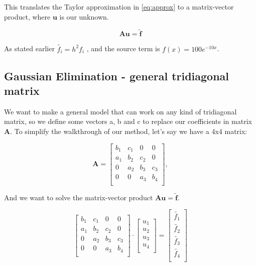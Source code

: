 \documentclass[oneside, final, 11pt, english, twocolumn]{article}
\begin{document}
This translates the Taylor approximation in \eqref{eq:approx} to a matrix-vector product, where $\mathbf{u}$ is our unknown. 

\begin{equation}
\mathbf{A}\mathbf{u} = \tilde{\mathbf{f}}
\label{eq:linalg}
\end{equation}

As stated earlier $\tilde{f_i} = h^2 f_i$ , and the source term is $f(x) = 100 e^{-10x}$. 


\subsection{Gaussian Elimination - general tridiagonal matrix}

We want to make a general model that can work on any kind of tridiagonal matrix, so we define some vectors a, b and c to replace our coefficients in matrix $\mathbf{A}$. To simplify the walkthrough of our method, let's say we have a 4x4 matrix: 

\[
    \mathbf{A} = \begin{bmatrix}
                           b_1& c_1& 0 &0 \\
                           a_1 & b_2 & c_2 &0  \\
                           0&a_2 &b_3 & c_3 \\
                           0&0 & a_3 & b_4 \\
                      \end{bmatrix},
\]


And we want to solve the matrix-vector product $\mathbf{A}\mathbf{u} = \tilde{\mathbf{f}}$. 

\[
\left[
\begin{array}{cccc}

                           b_1& c_1& 0 &0 \\
                           a_1 & b_2 & c_2 &0  \\
                           0&a_2 &b_3 & c_3 \\
                           0&0 & a_3 & b_4 \\
\end{array}
\right] \cdot
\left[
    \begin{array}{c}
    u_1 \\
    u_2 \\
    u_3 \\
    u_4 \\
    \end{array}
    \right] = 
    \left[
    \begin{array}{c}
    \tilde{f_1} \\
    \tilde{f_2} \\
    \tilde{f_3} \\
    \tilde{f_4} \\ 
    \end{array}
\right] 
\]
\end{document}
